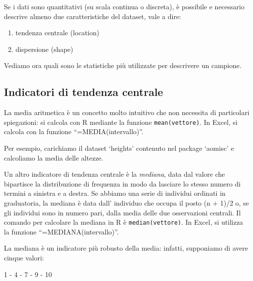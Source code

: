 \documentclass[a4paper,12pt,oneside]{book}
\providecommand{\tightlist}{%
  \setlength{\itemsep}{0pt}\setlength{\parskip}{0pt}}
\newenvironment{Shaded}{\begin{snugshade}}{\end{snugshade}}
\newcommand{\KeywordTok}[1]{\textcolor[rgb]{0.13,0.29,0.53}{\textbf{#1}}}
\newcommand{\OperatorTok}[1]{\textcolor[rgb]{0.81,0.36,0.00}{\textbf{#1}}}
\newcommand{\NormalTok}[1]{#1}
\theoremstyle{definition}
\theoremstyle{definition}
\theoremstyle{definition}
\theoremstyle{remark}
\begin{document}
Se i dati sono quantitativi (su scala continua o discreta), è possibile
e necessario descrive almeno due caratteristiche del dataset, vale a
dire:

\begin{enumerate}
\def\labelenumi{\arabic{enumi}.}
\tightlist
\item
  tendenza centrale (location)
\item
  dispersione (shape)
\end{enumerate}

Vediamo ora quali sono le statistiche più utilizzate per descrivere un
campione.

\subsection*{Indicatori di tendenza
centrale}\label{indicatori-di-tendenza-centrale}

La media aritmetica è un concetto molto intuitivo che non necessita di
particolari spiegazioni: si calcola con R mediante la funzione
\texttt{mean(vettore)}. In Excel, si calcola con la funzione
``=MEDIA(intervallo)''.

Per esempio, carichiamo il dataset `heights' contenuto nel package
`aomisc' e calcoliamo la media delle altezze.

\begin{Shaded}
\end{Shaded}

Un altro indicatore di tendenza centrale è la \emph{mediana}, data dal
valore che bipartisce la distribuzione di frequenza in modo da lasciare
lo stesso numero di termini a sinistra e a destra. Se abbiamo una serie
di individui ordinati in graduatoria, la mediana è data dall' individuo
che occupa il posto (n + 1)/2 o, se gli individui sono in numero pari,
dalla media delle due osservazioni centrali. Il comando per calcolare la
mediana in R è \texttt{median(vettore)}. In Excel, si utilizza la
funzione ``=MEDIANA(intervallo)''.

La mediana è un indicatore più robusto della media: infatti, supponiamo
di avere cinque valori:

1 - 4 - 7 - 9 - 10
\end{document}
